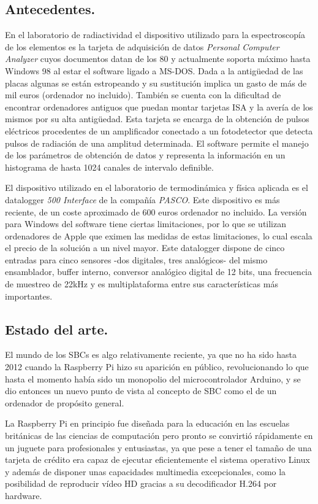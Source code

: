 \subsection{Antecedentes.}
  En el laboratorio de radiactividad el dispositivo utilizado para la espectroscopía de los elementos es la tarjeta de adquisición de datos \emph{Personal Computer Analyzer} cuyos documentos datan de los 80 y actualmente soporta máximo hasta Windows 98 al estar el software ligado a MS-DOS. Dada a la antigüedad de las placas algunas se están estropeando y su sustitución implica un gasto de más de mil euros (ordenador no incluido). También se cuenta con la dificultad de encontrar ordenadores antiguos que puedan montar tarjetas ISA y la avería de los mismos por su alta antigüedad. 
 Esta tarjeta se encarga de la obtención de pulsos eléctricos procedentes de un amplificador conectado a un fotodetector que detecta pulsos de radiación de una amplitud determinada. El software permite el manejo de los parámetros de obtención de datos y representa la información en un histograma de hasta 1024 canales de intervalo definible.

  El dispositivo utilizado en el laboratorio de termodinámica y física aplicada es el datalogger \emph{500 Interface} de la compañía \emph{PASCO}. Este dispositivo es más reciente, de un coste aproximado de 600 euros ordenador no incluido. La versión para Windows del software tiene ciertas limitaciones, por lo que se utilizan ordenadores de Apple que eximen las medidas de estas limitaciones, lo cual escala el precio de la solución a un nivel mayor.
  Este datalogger dispone de cinco entradas para cinco sensores -dos digitales, tres analógicos- del mismo ensamblador, buffer interno, conversor analógico digital de 12 bits, una frecuencia de muestreo de 22kHz y es multiplataforma entre sus características más importantes. 
 
\subsection{Estado del arte.} 
 El mundo de los SBCs es algo relativamente reciente, ya que no ha sido hasta 2012 cuando la Raspberry Pi hizo su aparición en público, revolucionando lo que hasta el momento había sido un monopolio del microcontrolador Arduino, y se dio entonces un nuevo punto de vista al concepto de SBC como el de un ordenador de propósito general.
 
  La Raspberry Pi en principio fue diseñada para la educación en las escuelas británicas de las ciencias de computación pero pronto se convirtió rápidamente en un juguete para profesionales y entusiastas, ya que pese a tener el tamaño de una tarjeta de crédito era capaz de ejecutar eficientemente el sistema operativo Linux y además de disponer unas capacidades multimedia excepcionales, como la posibilidad de reproducir vídeo HD gracias a su decodificador H.264 por hardware.
  
